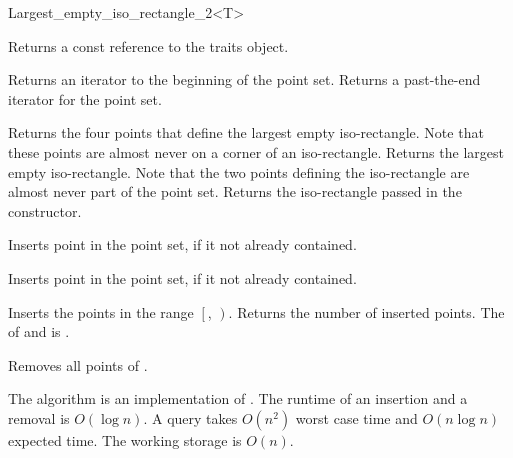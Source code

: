 \begin{ccRefClass}{Largest_empty_iso_rectangle_2<T>}
\ccOperations
{}


{}



\ccAccessFunctions

{Returns a const reference to the traits object.}


{Returns an iterator to the beginning of the point set.}
{Returns a past-the-end iterator for the point set.}



{Returns the four points that define the largest empty iso-rectangle.
Note that these points are almost never on a corner of an iso-rectangle.}
\ccGlue
{}
{Returns the largest empty iso-rectangle. Note that the two
points defining the iso-rectangle are almost never part of 
the point set.}
\ccGlue
{}
{Returns  the iso-rectangle passed in the constructor.}


{Inserts point  in the point set, if it not already contained.}

{Inserts point  in the point set, if it not already contained.}


{Inserts the points in the range $\left[\right.$,
$\left.\right)$.  Returns the number of inserted points.
\ccRequirement The  of  and  is
.}



{Removes all points of \ccVar.}


\ccImplementation

The algorithm is an implementation of \cite{}. The runtime of an
insertion and a removal is $O(\log n)$. A query takes $O(n^2)$ worst
case time and $O(n \log n)$ expected time. The working storage is $
O(n)$.









\end{ccRefClass}


